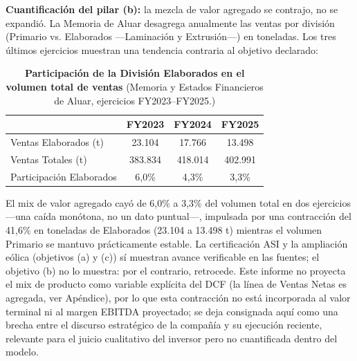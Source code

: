 \documentclass[10pt,a4paper]{article}
\begin{document}
\textbf{Cuantificación del pilar (b):} la mezcla de valor agregado se contrajo, no se expandió. La Memoria de Aluar desagrega anualmente las ventas por división (Primario vs. Elaborados —Laminación y Extrusión—) en toneladas. Los tres últimos ejercicios muestran una tendencia contraria al objetivo declarado:

\begin{table}[H]
\centering
\caption{\textbf{Participación de la División Elaborados en el volumen total de ventas} {\small\color{gsgray} (Memoria y Estados Financieros de Aluar, ejercicios FY2023–FY2025.)}}
\small
\begin{tabular}{lccc}
\toprule
 & \textbf{FY2023} & \textbf{FY2024} & \textbf{FY2025} \\
\midrule
Ventas Elaborados (t) & 23.104 & 17.766 & 13.498 \\
Ventas Totales (t) & 383.834 & 418.014 & 402.991 \\
Participación Elaborados & 6,0\% & 4,3\% & 3,3\% \\
\bottomrule
\end{tabular}
\end{table}

El mix de valor agregado cayó de 6,0\% a 3,3\% del volumen total en dos ejercicios —una caída monótona, no un dato puntual—, impulsada por una contracción del 41,6\% en toneladas de Elaborados (23.104 a 13.498 t) mientras el volumen Primario se mantuvo prácticamente estable. La certificación ASI y la ampliación eólica (objetivos (a) y (c)) sí muestran avance verificable en las fuentes; el objetivo (b) no lo muestra: por el contrario, retrocede. Este informe no proyecta el mix de producto como variable explícita del DCF (la línea de Ventas Netas es agregada, ver Apéndice), por lo que esta contracción no está incorporada al valor terminal ni al margen EBITDA proyectado; se deja consignada aquí como una brecha entre el discurso estratégico de la compañía y su ejecución reciente, relevante para el juicio cualitativo del inversor pero no cuantificada dentro del modelo.
\end{document}
